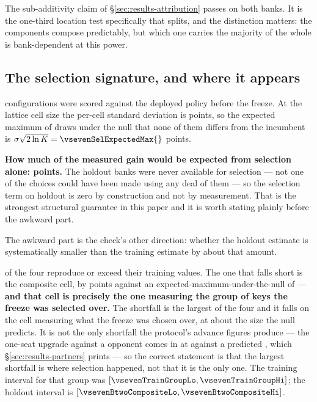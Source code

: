 The sub-additivity claim of \S\ref{sec:results-attribution} passes on both banks. It is the one-third
location test specifically that splits, and the distinction matters: the components compose
predictably, but which one carries the majority of the whole is bank-dependent at this power.

\subsection{The selection signature, and where it appears}
\label{sec:against-selection}

\vsevenSelK{} configurations were scored against the deployed policy before the freeze. At the lattice
cell size the per-cell standard deviation is \vsevenSelSigma{} points, so the expected maximum of
\vsevenSelK{} draws under the null that none of them differs from the incumbent is
$\sigma\sqrt{2\ln K} = \vsevenSelExpectedMax{}$ points.

\textbf{How much of the measured gain would be expected from selection alone: \vsevenSelOnHoldout{}
points.} The holdout banks were never available for selection --- not one of the \vsevenSelK{} choices
could have been made using any deal of them --- so the selection term on holdout is zero by
construction and not by measurement. That is the strongest structural guarantee in this paper and it
is worth stating plainly before the awkward part.

The awkward part is the check's other direction: whether the holdout estimate is systematically
smaller than the training estimate by about that amount.

\begin{table}[t]\centering
\caption{The four quantities the preregistered selection check tabulates, against their holdout
measurements. Three reproduce or exceed; one falls short. These are not every figure the protocol
states in advance --- the partner-regime predictions of \S\ref{sec:results-partners} are others, and
two of those also come in low.}
\label{tab:selection}
{\small}
\end{table}

\vsevenSelReproduce{} of the four reproduce or exceed their training values. The one that falls short
is the composite cell, by \vsevenSelWorstShortfall{} points against an expected-maximum-under-the-null
of \vsevenSelExpectedMax{} --- \textbf{and that cell is precisely the one measuring the group of keys
the freeze was selected over.} The shortfall is the largest of the four and it falls on the cell measuring what the freeze was
chosen over, at about the size the null predicts. It is not the only shortfall the protocol's
advance figures produce --- the one-seat upgrade against a \vsix{} opponent comes in at
\vsevenOneSeatSix{} against a predicted \vsevenTrainOneSeatSix{}, which \S\ref{sec:results-partners}
prints --- so the correct statement is that the largest shortfall is where selection happened, not
that it is the only one. The training interval for that group was
$[\vsevenTrainGroupLo, \vsevenTrainGroupHi]$; the holdout interval is
$[\vsevenBtwoCompositeLo, \vsevenBtwoCompositeHi]$.

